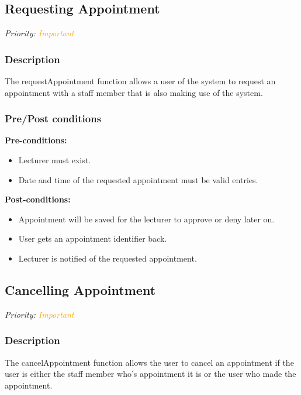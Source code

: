 \subsection{Requesting Appointment}
\textit{Priority: \textcolor{orange}{Important}} \\

\subsubsection{ Description}
The requestAppointment function allows a user of the system to request an appointment with a staff member that is also making use of the system. \\

\subsubsection{Pre/Post conditions}
\textbf{Pre-conditions:} 
	\begin{itemize}
		\item Lecturer must exist.
		\item Date and time of the requested appointment must be valid entries.
	\end{itemize}
\textbf{Post-conditions:} 
	\begin{itemize}
		\item Appointment will be saved for the lecturer to approve or deny later on.
		\item User gets an appointment identifier back.
		\item Lecturer is notified of the requested appointment. 
	\end{itemize}



\subsection{Cancelling Appointment}
\textit{Priority: \textcolor{orange}{Important}} \\

\subsubsection{Description}
The cancelAppointment function allows the user to cancel an appointment if the user is either the staff member who's appointment it is or the user who made the appointment. \\


